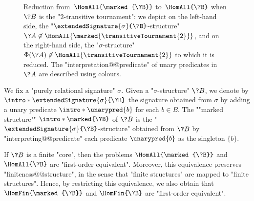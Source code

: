 \begin{figure}
	\centering
	\begin{tikzpicture}
		
	\end{tikzpicture}
	\hspace{1cm}
	\begin{tikzpicture}
		
	\end{tikzpicture}
	\caption{\AP\label{fig:dichotomy-idempotent-core}
	Reduction from $\,\HomAll{\marked{\?B}}$ to $\,\HomAll{\?B}$ when $\?B$ 
	is the "$2$-transitive tournament":
	we depict on the left-hand side, the "$\extendedSignature{\sigma}{\?B}$-structure"
	$\?A \not\in \HomAll{\marked{\transitiveTournament{2}}}$,
	and on the right-hand side, the "$\sigma$-structure" $\Phi(\?A)
	\not\in \HomAll{\transitiveTournament{2}}$ to which it is reduced.
	The "interpretation@@predicate" of unary predicates in $\?A$
	are described using colours.}
\end{figure}
We fix a "purely relational signature" $\sigma$.
Given a "$\sigma$-structure" $\?B$,
we denote by \AP$\intro*\extendedSignature{\sigma}{\?B}$
the signature obtained from $\sigma$ by adding
a unary predicate \AP$\intro*\unarypred{b}$ for each $b\in B$.
The \AP""marked structure"" \AP$\intro*\marked{\?B}$ of $\?B$ is the
"$\extendedSignature{\sigma}{\?B}$-structure"
obtained from $\?B$ by "interpreting@@predicate" each predicate $\unarypred{b}$ as the
singleton $\{b\}$.

\begin{proposition}[Folklore]
	\!%
	\AP\label{prop:idempotent-core-preserves-csp-complexity}
	If $\?B$ is a finite "core", then the problems $\HomAll{\marked{\?B}}$ and 
	$\HomAll{\?B}$ are "first-order equivalent".
	Moreover, this equivalence preserves "finiteness@@structure",
	in the sense that "finite structures" are mapped to "finite structures".  
	Hence, by restricting this equivalence, we also obtain that
	$\HomFin{\marked{\?B}}$ and $\HomFin{\?B}$ are "first-order equivalent".
\end{proposition}

